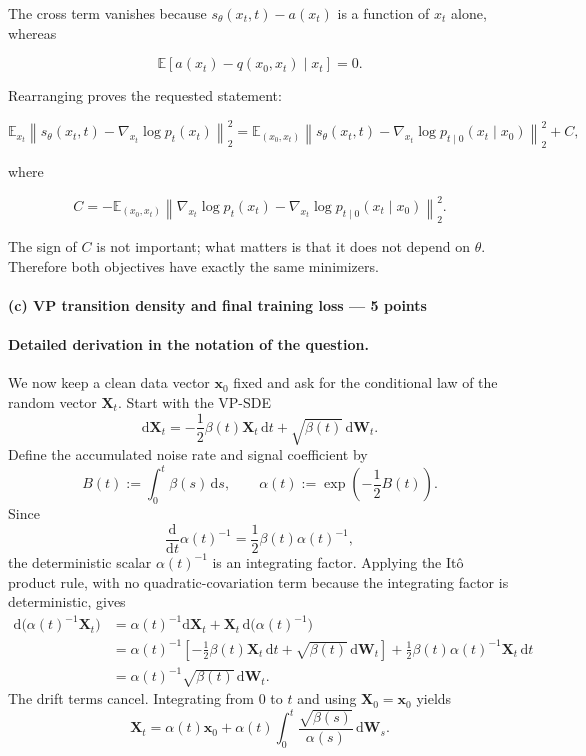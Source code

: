 \documentclass[11pt,a4paper]{article}
\theoremstyle{definition}
\begin{document}
The cross term vanishes because $s_\theta(x_t,t)-a(x_t)$ is a function of $x_t$ alone, whereas

\[
\mathbb{E}\left[a(x_t)-q(x_0,x_t)\mid x_t\right]=0.
\]

Rearranging proves the requested statement:

\[
\mathbb{E}_{x_t}\left\|s_\theta(x_t,t)-\nabla_{x_t}\log p_t(x_t)\right\|_2^2
= \mathbb{E}_{(x_0,x_t)}\left\|s_\theta(x_t,t)-\nabla_{x_t}\log p_{t\mid 0}(x_t\mid x_0)\right\|_2^2+C,
\]

where

\[
C=-\mathbb{E}_{(x_0,x_t)}
\left\|\nabla_{x_t}\log p_t(x_t)-\nabla_{x_t}\log p_{t\mid 0}(x_t\mid x_0)\right\|_2^2.
\]

The sign of $C$ is not important; what matters is that it does not depend on $\theta$. Therefore both objectives have exactly the same minimizers.

\paragraph{(c) VP transition density and final training loss --- 5 points}

\paragraph{Detailed derivation in the notation of the question.}
We now keep a clean data vector $\mathbf{x}_0$ fixed and ask for the conditional law of
the random vector $\mathbf{X}_t$. Start with the VP-SDE
\[
\mathrm{d}\mathbf{X}_t
=-\frac12\beta(t)\mathbf{X}_t\,\mathrm{d}t
+\sqrt{\beta(t)}\,\mathrm{d}\mathbf{W}_t.
\]
Define the accumulated noise rate and signal coefficient by
\[
B(t):=\int_0^t\beta(s)\,\mathrm{d}s,
\qquad
\alpha(t):=\exp\!\left(-\frac12B(t)\right).
\]
Since
\[
\frac{\mathrm{d}}{\mathrm{d}t}\alpha(t)^{-1}
=\frac12\beta(t)\alpha(t)^{-1},
\]
the deterministic scalar $\alpha(t)^{-1}$ is an integrating factor. Applying the
It\^o product rule, with no quadratic-covariation term because the integrating factor is
deterministic, gives
\[
\begin{aligned}
\mathrm{d}\bigl(\alpha(t)^{-1}\mathbf{X}_t\bigr)
&=
\alpha(t)^{-1}\mathrm{d}\mathbf{X}_t
+\mathbf{X}_t\,\mathrm{d}\bigl(\alpha(t)^{-1}\bigr)\\
&=
\alpha(t)^{-1}
\left[
-\frac12\beta(t)\mathbf{X}_t\,\mathrm{d}t
+\sqrt{\beta(t)}\,\mathrm{d}\mathbf{W}_t
\right]
+\frac12\beta(t)\alpha(t)^{-1}\mathbf{X}_t\,\mathrm{d}t\\
&=
\alpha(t)^{-1}\sqrt{\beta(t)}\,\mathrm{d}\mathbf{W}_t.
\end{aligned}
\]
The drift terms cancel. Integrating from $0$ to $t$ and using
$\mathbf{X}_0=\mathbf{x}_0$ yields
\[
\mathbf{X}_t
=\alpha(t)\mathbf{x}_0
+\alpha(t)\int_0^t
\frac{\sqrt{\beta(s)}}{\alpha(s)}\,\mathrm{d}\mathbf{W}_s.
\]
\end{document}

